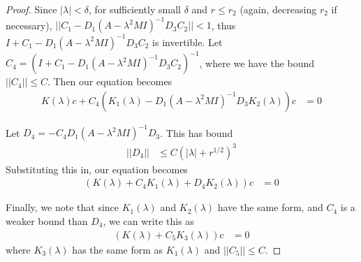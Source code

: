 \documentclass[thesis.tex]{subfiles}
\begin{document}
\begin{lemma}
\begin{proof}
Since $|\lambda| < \delta$, for sufficiently small $\delta$ and $r \leq r_2$ (again, decreasing $r_2$ if necessary), $|| C_1 - D_1 (A - \lambda^2 MI)^{-1} D_3 C_2 || < 1$, thus $I + C_1 - D_1 (A - \lambda^2 MI)^{-1} D_3 C_2$ is invertible. Let $C_4 = (I + C_1 - D_1 (A - \lambda^2 MI)^{-1} D_3 C_2)^{-1}$, where we have the bound $||C_4|| \leq C$. Then our equation becomes
\begin{align*}
K(\lambda)c + C_4(K_1(\lambda) - D_1 (A - \lambda^2 MI)^{-1} D_3 K_2(\lambda))c &= 0
\end{align*}

Let $D_4 = -C_4 D_1 (A - \lambda^2 MI)^{-1} D_3$. This has bound
\begin{align*}
||D_4|| &\leq C (|\lambda| + r^{1/2})^3
\end{align*}
Substituting this in, our equation becomes
\begin{align*}
(K(\lambda) + C_4 K_1(\lambda) + D_4 K_2(\lambda))c &= 0
\end{align*}

Finally, we note that since $K_1(\lambda)$ and $K_2(\lambda)$ have the same form, and $C_4$ is a weaker bound than $D_4$, we can write this as
\begin{align*}
(K(\lambda) + C_5 K_3(\lambda))c &= 0
\end{align*}
where $K_3(\lambda)$ has the same form as $K_1(\lambda)$ and $||C_5|| \leq C$.
\end{proof}
\end{lemma}
\end{document}
